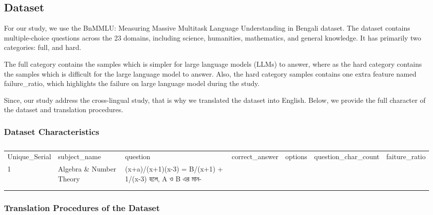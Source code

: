 
\subsection{Dataset}

For our study, we use the BnMMLU: Measuring Massive Multitask Language Understanding in Bengali \cite{joy-shatabda-2026-bnmmlu} dataset. The dataset contains multiple-choice questions across the 23 domains, including science, humanities, mathematics, and general knowledge. It has primarily two categories: full, and hard.

The full category contains the samples which is simpler for large language models (LLMs) to answer, where as the hard category contains the samples which is difficult for the large language model to answer. Also, the hard category samples contains one extra feature named failure\_ratio, which highlights the failure on large language model during the study.

Since, our study address the cross-lingual study, that is why we translated the dataset into English. Below, we provide the full character of the dataset and translation procedures.

\subsubsection{Dataset Characteristics}

\begin{table}[]
	\centering
	\begin{tabular}{@{}lllllll@{}}
		\cmidrule(r){1-5}
		Unique\_Serial & subject\_name            & question                                              & correct\_answer & options & question\_char\_count & faiture\_ratio \\ \cmidrule(r){1-5}
		1              & Algebra \& Number Theory & (x+a)/(x+1)(x-3) = B/(x+1) + 1/(x-3) হলে, A ও B এর মান- &                 &         &                       &                \\
		               &                          &                                                       &                 &         &                       &                \\
		               &                          &                                                       &                 &         &                       &                \\ \cmidrule(r){1-5}
	\end{tabular}
	\caption{}
	\label{tab:my-table}
\end{table}

\subsubsection{Translation Procedures of the Dataset}
